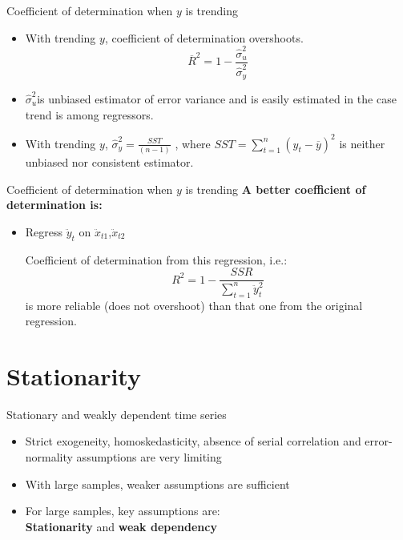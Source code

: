 \documentclass{beamer}
\begin{document}
\begin{frame}{Coefficient of determination when $y$ is trending}
\begin{itemize}
\item With trending $y$, coefficient of determination overshoots.
$$\overline{R}^2=1-\frac{\hat{\sigma}^2_u}{\hat{\sigma}^2_y}$$

\item $\hat{\sigma}^2_u$is unbiased estimator of error variance and is easily estimated in the case trend is among regressors.\\

\vspace{0.5cm}

\item With trending $y$, $\hat{\sigma}^2_y=\frac{SST}{(n-1)}$ , where $SST=\sum_{t=1}^n (y_t-\overline{y})^2$ is neither unbiased nor consistent estimator.
\end{itemize}
\end{frame}


\begin{frame}{Coefficient of determination when $y$ is trending}
\textbf{A better coefficient of determination is:}

\begin{itemize}
\item Regress $\ddot{y}_{t}$ on $\ddot{x}_{t1}$,$\ddot{x}_{t2}$ 

\vspace{0.5cm}

Coefficient of determination from this regression, i.e.: 
$$R^2=1-\frac{SSR}{\sum^n_{t=1}\ddot{y}^2_t}$$ 
is more reliable (does not overshoot) than that one from the original regression.
\end{itemize}
\end{frame}


\section{Stationarity}

\begin{frame}{Stationary and weakly dependent time series}
\begin{itemize}
\item Strict exogeneity, homoskedasticity, absence of serial correlation and error-normality assumptions are very limiting 

\vspace{0.5cm}

\item With large samples, weaker assumptions are sufficient

\vspace{0.5cm}

\item For large samples, key assumptions are: \\ \textbf{Stationarity} and \textbf{weak dependency}
\end{itemize}
\end{frame}
\end{document}
